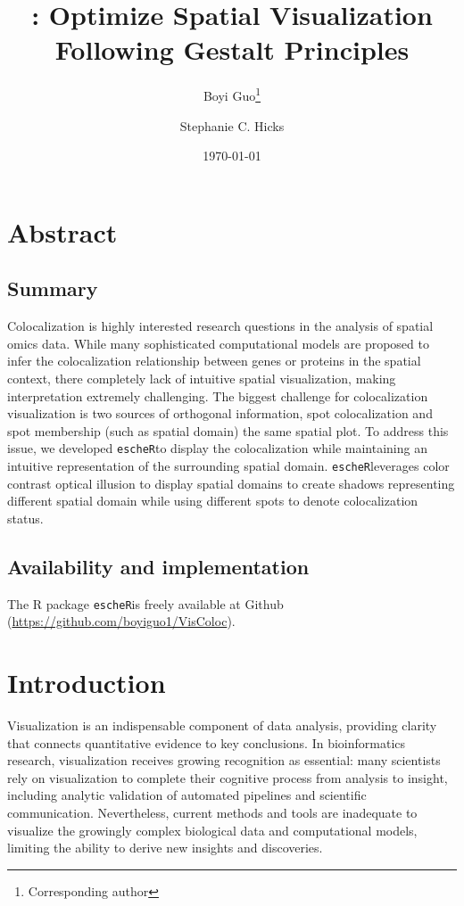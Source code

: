 \documentclass[11pt]{article}
\title{\coloc: Optimize Spatial Visualization Following Gestalt Principles}
\author[1]{Boyi Guo\thanks{Corresponding author}}
\author[1]{Stephanie C. Hicks}
\affil[1]{Department of Biostatistics, Johns Hopkins Bloomberg School of Public Health, MD, USA}
\date{\today}
\newcommand{\fixme}[1]{{\color{red} (#1)}}
\newcommand{\coloc}{\texttt{escheR}}
\begin{document}
\maketitle

\vspace{-.6in}

\section*{Abstract}
\subsection*{Summary}
Colocalization is highly interested research questions in the analysis of spatial omics data. While many sophisticated computational models are proposed to infer the colocalization relationship between genes or proteins in the spatial context, there completely lack of intuitive spatial visualization, making interpretation extremely challenging. The biggest challenge for colocalization visualization is two sources of orthogonal information, spot colocalization and spot membership (such as spatial domain) the same spatial plot. To address this issue, we developed \coloc to display the colocalization while maintaining an intuitive representation of the surrounding spatial domain. \coloc leverages color contrast optical illusion to display spatial domains to create shadows representing different spatial domain while using different spots to denote colocalization status.  

\subsection*{Availability and implementation}
The R package \coloc is freely available at Github (\url{https://github.com/boyiguo1/VisColoc}).


\section*{Introduction}
Visualization is an indispensable component of data analysis, providing clarity that connects quantitative evidence to key conclusions.\cite{dagostinomcgowan_2022} In bioinformatics research, visualization receives growing recognition as essential: many scientists rely on visualization to complete their cognitive process from analysis to insight, including analytic validation of automated pipelines and scientific communication.\cite{odonoghue_2021} Nevertheless, current methods and tools are inadequate to visualize the growingly complex biological data and computational models, limiting the ability to derive new insights and discoveries.\cite{odonoghue_2010}  
\end{document}
